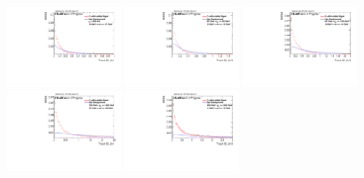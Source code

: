 \begin{figure}[H]
\bigskip
\includegraphics[width=0.3\textwidth]{sascha_input/Appendix/Distributions/higgs/distributions/beta3/h_normal_tj_D2_3_bin1.pdf} \hspace{1mm}
\includegraphics[width=0.3\textwidth]{sascha_input/Appendix/Distributions/higgs/distributions/beta3/h_normal_tj_D2_3_bin2.pdf} \hspace{4mm}
\includegraphics[width=0.3\textwidth]{sascha_input/Appendix/Distributions/higgs/distributions/beta3/h_normal_tj_D2_3_bin3.pdf} 
\bigskip
\includegraphics[width=0.3\textwidth]{sascha_input/Appendix/Distributions/higgs/distributions/beta3/h_normal_tj_D2_3_bin4.pdf} \hspace{4mm}
\includegraphics[width=0.3\textwidth]{sascha_input/Appendix/Distributions/higgs/distributions/beta3/h_normal_tj_D2_3_bin5.pdf} 


\end{figure}
